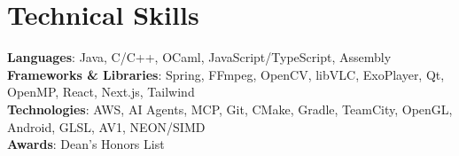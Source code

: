 \documentclass[letterpaper,11pt]{article}
\begin{document}
    \section{Technical Skills}
    \begin{itemize}[leftmargin=0.15in, label={}]
    \small{\item{
        \textbf{Languages}{: Java, C/C++, OCaml, JavaScript/TypeScript, Assembly} \\
        \textbf{Frameworks \& Libraries}{: Spring, FFmpeg, OpenCV, libVLC, ExoPlayer, Qt, OpenMP, React, Next.js, Tailwind} \\
        \textbf{Technologies}{: AWS, AI Agents, MCP, Git, CMake, Gradle, TeamCity, OpenGL, Android, GLSL, AV1, NEON/SIMD} \\
        \textbf{Awards}{: Dean's Honors List}
    }}
    \end{itemize}


\end{document}
